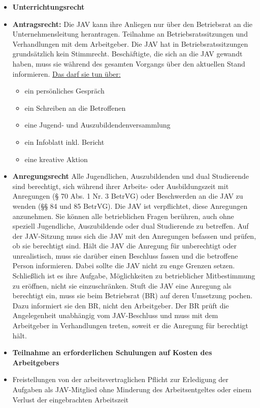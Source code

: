 \begin{itemize}
	\item
	\textbf{Unterrichtungsrecht}
	\item 
	\textbf{Antragsrecht:}
	\newline 
	{
	Die JAV kann ihre Anliegen nur über den Betriebsrat an die Unternehmensleitung herantragen.
	\newline	
	Teilnahme an Betriebsratssitzungen und Verhandlungen mit dem Arbeitgeber. 
	\newline
	Die JAV hat in Betriebsratssitzungen grundsätzlich kein Stimmrecht.
	\newline
		Beschäftigte, die sich an die JAV gewandt haben, muss sie während des gesamten Vorgangs über den aktuellen Stand informieren. \newline 
		\underline{Das darf sie tun über:}
	}
	\begin{itemize}
		\item 
		ein persönliches Gespräch
		\item
		ein Schreiben an die Betroffenen
		\item
		eine Jugend- und Auszubildendenversammlung 
		\item
		ein Infoblatt inkl. Bericht
		\item
		eine kreative Aktion
	\end{itemize}
	\item 
	\textbf{Anregungsrecht}
	\newline 
	{
		Alle Jugendlichen, Auszubildenden und dual Studierende sind berechtigt, sich während ihrer Arbeits- oder Ausbildungszeit mit Anregungen (§ 70 Abs. 1 Nr. 3 BetrVG) oder Beschwerden an die JAV zu wenden (§§ 84 und 85 BetrVG).
		\newline
		Die JAV ist verpflichtet, diese Anregungen anzunehmen. Sie können alle betrieblichen Fragen berühren, auch ohne speziell Jugendliche, Auszubildende oder dual Studierende zu betreffen. Auf der JAV-Sitzung muss sich die JAV mit den Anregungen befassen und prüfen, ob sie berechtigt sind.
		\newline
		Hält die JAV die Anregung für unberechtigt oder unrealistisch, muss sie darüber einen Beschluss fassen und die betroffene Person informieren. Dabei sollte die JAV nicht zu enge Grenzen setzen. Schließlich ist es ihre Aufgabe, Möglichkeiten zu betrieblicher Mitbestimmung zu eröffnen, nicht sie einzuschränken.
		\newline
		Stuft die JAV eine Anregung als berechtigt ein, muss sie beim Betriebsrat (BR) auf deren Umsetzung pochen. Dazu informiert sie den BR, nicht den Arbeitgeber. Der BR prüft die Angelegenheit unabhängig vom JAV-Beschluss und muss mit dem Arbeitgeber in Verhandlungen treten, soweit er die Anregung für berechtigt hält.
	}
	\item
	\textbf{Teilnahme an erforderlichen Schulungen auf Kosten des Arbeitgebers}
	\item
	Freistellungen von der arbeitsvertraglichen Pflicht zur Erledigung der Aufgaben als JAV-Mitglied ohne Minderung des Arbeitsentgeltes oder einem Verlust der eingebrachten Arbeitszeit
\end{itemize}
